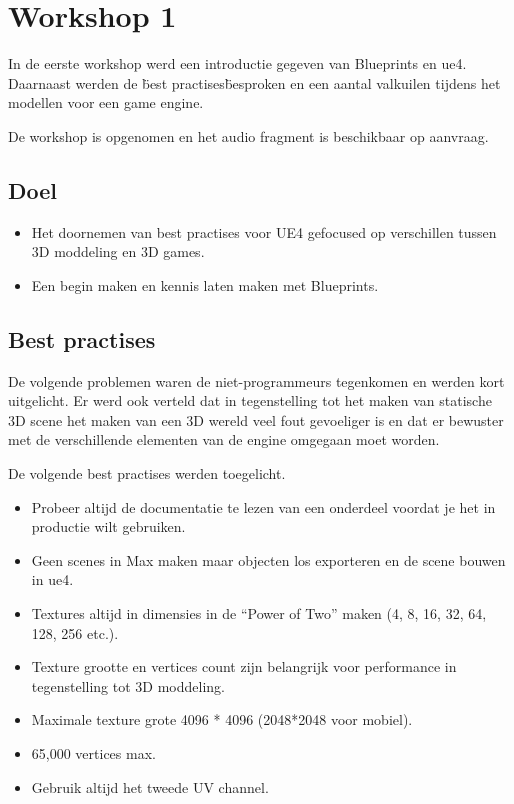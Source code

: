 
\chapter{Workshop 1}
\label{appendix:workshop1}
\lhead{}
In de eerste workshop werd een introductie gegeven van Blueprints en \gls{ue4}.
Daarnaast werden de \"best practises\" besproken en een aantal valkuilen tijdens het modellen voor een game engine.

De workshop is opgenomen en het audio fragment is beschikbaar op aanvraag.

\section{Doel}
\begin{itemize}
	\item Het doornemen van best practises voor UE4 gefocused op verschillen tussen 3D moddeling en 3D games. 
	\item Een begin maken en kennis laten maken met Blueprints.
\end{itemize}

\section{Best practises}
De volgende problemen waren de niet-programmeurs tegenkomen en werden kort uitgelicht. Er werd ook verteld dat in tegenstelling tot het maken van statische 3D scene het maken van een 3D wereld veel fout gevoeliger is en dat er bewuster met de verschillende elementen van de engine omgegaan moet worden.

De volgende best practises werden toegelicht.
\begin{itemize}
	\item Probeer altijd de documentatie te lezen van een onderdeel voordat je het in productie wilt gebruiken.
	\item Geen scenes in Max maken maar objecten los exporteren en de scene bouwen in \gls{ue4}.
	\item Textures altijd in dimensies in de “Power of Two” maken (4, 8, 16, 32, 64, 128, 256 etc.).
	\item Texture grootte en vertices count zijn belangrijk voor performance in tegenstelling tot 3D moddeling.
	\item Maximale texture grote 4096 * 4096 (2048*2048 voor mobiel).
	\item 65,000 vertices max.
	\item Gebruik altijd het tweede UV channel.
\end{itemize}

